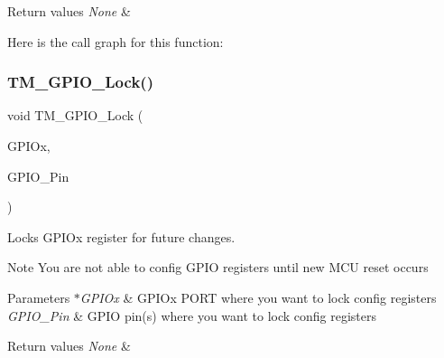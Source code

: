 \begin{DoxyRetVals}{Return values}
{\em None} & \\
\hline
\end{DoxyRetVals}
Here is the call graph for this function\+:
\mbox{\label{group___t_m___g_p_i_o___functions_gaf52cf03a031c506fa46518a1e42c8ce2}} 
\subsubsection{\texorpdfstring{T\+M\+\_\+\+G\+P\+I\+O\+\_\+\+Lock()}{TM\_GPIO\_Lock()}}
{\footnotesize\ttfamily void T\+M\+\_\+\+G\+P\+I\+O\+\_\+\+Lock (\begin{DoxyParamCaption}\item[{G\+P\+I\+O\+\_\+\+Type\+Def $\ast$}]{G\+P\+I\+Ox,  }\item[{uint16\+\_\+t}]{G\+P\+I\+O\+\_\+\+Pin }\end{DoxyParamCaption})}



Locks G\+P\+I\+Ox register for future changes. 

\begin{DoxyNote}{Note}
You are not able to config G\+P\+IO registers until new M\+CU reset occurs 
\end{DoxyNote}

\begin{DoxyParams}{Parameters}
{\em $\ast$\+G\+P\+I\+Ox} & G\+P\+I\+Ox P\+O\+RT where you want to lock config registers \\
\hline
{\em G\+P\+I\+O\+\_\+\+Pin} & G\+P\+IO pin(s) where you want to lock config registers \\
\hline
\end{DoxyParams}

\begin{DoxyRetVals}{Return values}
{\em None} & \\
\hline
\end{DoxyRetVals}
\mbox{\label{group___t_m___g_p_i_o___functions_ga7828700c54f2449fed2afb0a84c1698d}} 
